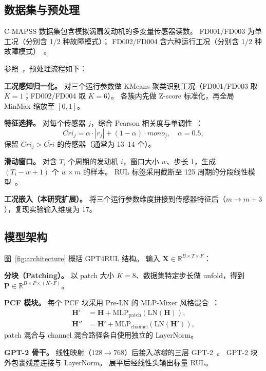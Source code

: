 \documentclass[UTF8,a4paper,10pt,twocolumn]{ctexart}
\begin{document}
\subsection{数据集与预处理}

C-MAPSS 数据集包含模拟涡扇发动机的多变量传感器读数。
FD001/FD003 为单工况（分别含 1/2 种故障模式）；
FD002/FD004 含六种运行工况（分别含 1/2 种故障模式）~\cite{saxena2008}。

参照~\cite{tan2025}，预处理流程如下：

\textbf{工况感知归一化。}
对三个运行参数做 KMeans 聚类识别工况（FD001/FD003 取 $K=1$；FD002/FD004 取 $K=6$）。
各簇内先做 Z-score 标准化，再全局 MinMax 缩放至 $[0,1]$。

\textbf{特征选择。}
对每个传感器 $j$，综合 Pearson 相关度与单调性~\cite{tan2025}：
\begin{equation}
  Cri_j = \alpha \cdot |r_j| + (1-\alpha) \cdot mono_j, \quad \alpha = 0.5,
\end{equation}
保留 $Cri_j > \bar{Cri}$ 的传感器（通常为 13--14 个）。

\textbf{滑动窗口。}
对含 $T_i$ 个周期的发动机 $i$，窗口大小 $w$、步长 1，生成 $(T_i - w + 1)$ 个 $w \times m$ 的样本。
RUL 标签采用截断至 125 周期的分段线性模型~\cite{saxena2008}。

\textbf{工况嵌入（本研究扩展）。}
将三个运行参数维度拼接到传感器特征后（$m \rightarrow m+3$），复现实验输入维度为 17。

\subsection{模型架构}

图~\ref{fig:architecture} 概括 GPT4RUL 结构。
输入 $\mathbf{X} \in \mathbb{R}^{B \times T \times F}$：

\textbf{分块（Patching）。}
以 patch 大小 $K=8$、数据集特定步长做 unfold，得到 $\mathbf{P} \in \mathbb{R}^{B \times P \times (K \cdot F)}$。

\textbf{PCF 模块。}
每个 PCF 块采用 Pre-LN 的 MLP-Mixer 风格混合~\cite{tolstikhin2021}：
\begin{align}
  \mathbf{H}' &= \mathbf{H} + \mathrm{MLP}_{\mathrm{patch}}(\mathrm{LN}(\mathbf{H})), \\
  \mathbf{H}'' &= \mathbf{H}' + \mathrm{MLP}_{\mathrm{channel}}(\mathrm{LN}(\mathbf{H}')),
\end{align}
patch 混合与 channel 混合路径各自使用独立的 LayerNorm。

\textbf{GPT-2 骨干。}
线性映射（$128 \rightarrow 768$）后接入\emph{冻结}的三层 GPT-2~\cite{radford2019}。
GPT-2 块外包裹残差连接与 LayerNorm。
展平后经线性头输出标量 RUL。
\end{document}
